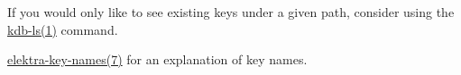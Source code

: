 \begin{DoxyItemize}
\item If you would only like to see existing keys under a given path, consider using the \mbox{\hyperlink{doc_help_kdb-ls_md}{kdb-\/ls(1)}} command.
\item \mbox{\hyperlink{doc_help_elektra-key-names_md}{elektra-\/key-\/names(7)}} for an explanation of key names. 
\end{DoxyItemize}